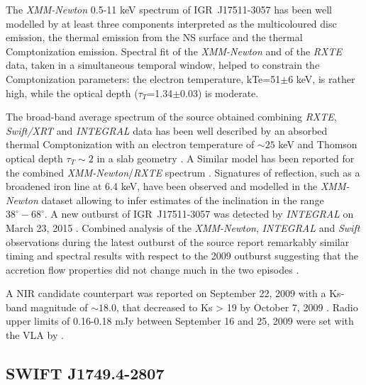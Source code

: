 \documentclass[graybox]{svmult}
\def \inte {{\em INTEGRAL\xspace}}
\def \swift {{\em Swift\xspace}}
\def \xmm {{\em XMM-Newton\xspace}}
\def \rxte {{\em RXTE\xspace}}
\def \swiftxrt{{\em Swift/XRT\xspace}}
\begin{document}
The \xmm{} 0.5-11 keV spectrum of IGR~J17511-3057 has been well modelled by at least three components interpreted as the multicoloured disc emission, the thermal emission from the NS surface and the thermal Comptonization emission. Spectral fit of the \xmm{} and of the \rxte{}
data, taken in a simultaneous temporal window, helped to constrain the Comptonization parameters: the electron temperature, kTe=51$\pm$6 keV, is rather high, while the optical
depth ($\tau_T$=1.34$\pm$0.03) is moderate.

The broad-band average spectrum of the source obtained combining \rxte{}, \swiftxrt{} and \inte{} data has been well described by an absorbed thermal Comptonization with an electron temperature of $\sim25$ keV and Thomson optical depth $\tau_T\sim2$ in a slab geometry \cite{Falanga2011}. A Similar model has been reported for the combined \xmm{}/\rxte{} spectrum \cite{Papitto2010}. Signatures of reflection, such as a broadened iron line at 6.4 keV, have been observed and modelled in the \xmm{} dataset \cite{Papitto2010} allowing to infer estimates of the inclination in the range $38^\circ-68^\circ$. A new outburst of IGR~J17511-3057 was detected by \inte{} on March 23, 2015 \cite{Bozzo2015b,Bozzo2015c}. Combined analysis of the \xmm{}, \inte{} and \swift{} observations during the latest outburst of the source report remarkably similar timing and spectral results with respect to the 2009 outburst suggesting that the accretion flow properties did not change much in the two episodes \cite{Papitto2016}.

A NIR candidate counterpart was reported on September 22, 2009 with a Ks-band magnitude of $\sim18.0$, that decreased to Ks > 19 by October 7, 2009 \cite{Torres2009}. Radio upper limits of 0.16-0.18 mJy between September 16 and 25, 2009 were set
with the VLA by \cite{MillerJones2009}.


\subsection{SWIFT J1749.4-2807}
\end{document}
